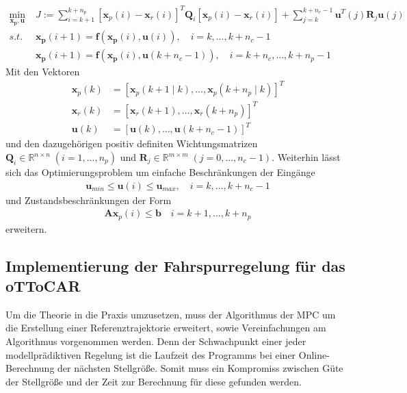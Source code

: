\begin{align*}
	\underset{\boldsymbol{x_p, u}}{\text{min}}\;&J:=\sum_{i=k+1}^{k+n_p} \left [\boldsymbol{x}_{p}(i)-\boldsymbol{x}_{r}(i)\right ]^T\boldsymbol{Q}_i\left [\boldsymbol{x}_{p}(i)-\boldsymbol{x}_{r}(i)\right ] +\sum_{j=k}^{k+n_c-1} \boldsymbol{u}^T(j)\boldsymbol{R}_j\boldsymbol{u}(j)\\
	s.t.\;&\boldsymbol{x_p}(i+1)=\boldsymbol{f}\left ( \boldsymbol{x_p}(i), \boldsymbol{u}(i) \right ),\quad i=k,...,k+n_c-1\\
	&\boldsymbol{x_p}(i+1)=\boldsymbol{f}\left ( \boldsymbol{x_p}(i), \boldsymbol{u}(k+n_c-1) \right ),\quad i=k+n_c,...,k+n_p-1
\end{align*}
Mit den Vektoren
\begin{align*}
	\boldsymbol{x}_p(k)&=\left [ \boldsymbol{x}_p(k+1\mid k),\dots,\boldsymbol{x}_p(k+n_p\mid k) \right ]^T\\
	\boldsymbol{x}_r(k)&=\left [ \boldsymbol{x}_r(k+1),\dots,\boldsymbol{x}_r(k+n_p) \right ]^T\\
	\boldsymbol{u}(k)&=\left [ \boldsymbol{u}(k),\dots,\boldsymbol{u}(k+n_c-1) \right ]^T
\end{align*}
und den dazugehörigen positiv definiten Wichtungsmatrizen $\boldsymbol{Q}_i\in\mathbb{R}^{n\times n}\;(i=1, ...,n_p)$ und $\boldsymbol{R}_j\in\mathbb{R}^{m\times m}\;(j=0, ...,n_c-1)$. Weiterhin lässt sich das Optimierungsproblem um einfache Beschränkungen der Eingänge
\begin{align*}
  \boldsymbol{u}_{min} \leq \boldsymbol{u}(i) \leq \boldsymbol{u}_{max},\quad i=k,...,k+n_c-1
\end{align*}
und Zustandsbeschränkungen der Form
\begin{align*}
  \boldsymbol{A}\boldsymbol{x}_p(i) \leq \boldsymbol{b}\quad i=k+1,...,k+n_p
\end{align*}
erweitern.

\subsection{Implementierung der Fahrspurregelung für das oTToCAR}
Um die Theorie in die Praxis umzusetzen, muss der Algorithmus der MPC um die Erstellung einer Referenztrajektorie erweitert, sowie Vereinfachungen am Algorithmus vorgenommen werden. Denn der Schwachpunkt einer jeder modellprädiktiven Regelung ist die Laufzeit des Programms bei einer Online-Berechnung der nächsten Stellgröße. Somit muss ein Kompromiss zwischen Güte der Stellgröße und der Zeit zur Berechnung für diese gefunden werden.
